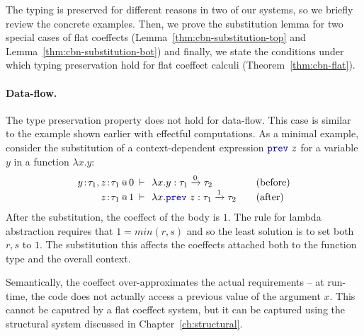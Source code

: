 The typing is preserved for different reasons in two of our systems, so we briefly review the 
concrete examples. Then, we prove the substitution lemma for two special cases of flat coeffects
(Lemma~\ref{thm:cbn-substitution-top} and Lemma~\ref{thm:cbn-substitution-bot}) and finally, we
state the conditions under which typing preservation hold for flat coeffect calculi 
(Theorem~\ref{thm:cbn-flat}).

\paragraph{Data-flow.} 
The type preservation property does not hold for data-flow. This case is similar to the example
shown earlier with effectful computations. As a minimal example, consider the substitution of 
a context-dependent expression $\kvd{prev}~z$ for a variable $y$ in a function $\lambda x.y$:
%
\begin{equation*}
\begin{array}{rclcl}
 \coctx{y\!:\!\tau_1,z\!:\!\tau_1}{0} &\narrow{\vdash}& \lambda x.y : \tau_1 \xrightarrow{0} \tau_2 & & (\textnormal{before}) \\
 \coctx{z\!:\!\tau_1}{1} &\narrow{\vdash}& \lambda x.\kvd{prev}~z : \tau_1 \xrightarrow{1} \tau_2 & & (\textnormal{after}) \\
\end{array}
\end{equation*}
%
After the substitution, the coeffect of the body is $1$. The rule for lambda abstraction requires
that $1=\mathit{min}(r,s)$ and so the least solution is to set both $r,s$ to $1$. The substitution
this affects the coeffects attached both to the function type and the overall context. 

Semantically, the coeffect over-approximates the actual requirements -- at run-time, the code does not 
actually access a previous value of the argument $x$. This cannot be caputred by a flat coeffect 
system, but it can be captured using the structural system discussed in Chapter~\ref{ch:structural}. 

